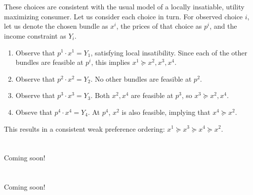 \documentclass[12pt]{article}
\theoremstyle{definition}
\theoremstyle{remark}
\begin{document}
\section{}
These choices are consistent with the usual model of a locally insatiable, utility maximizing consumer. Let us consider each choice in turn. For observed choice $i$, let us denote the chosen bundle as $x^i$, the prices of that choice as $p^i$, and the income constraint as $Y_i$.
\begin{enumerate}
  \item Observe that $p^1 \cdot x^1 = Y_1$, satisfying local insatibility. Since each of the other bundles are feasible at $p^i$, this implies $x^1 \succeq x^2, x^3, x^4$.
  \item Observe that $p^2 \cdot x^2 = Y_2$. No other bundles are feasible at $p^2$.
  \item Observe that $p^3 \cdot x^3 = Y_3$. Both $x^2, x^4$ are feasible at $p^3$, so $x^3 \succeq x^2, x^4$.
  \item Obseve that $p^4 \cdot x^4 = Y_4$. At $p^4$, $x^2$ is also feasible, implying that $x^4 \succeq x^2$.
\end{enumerate}
This results in a consistent weak preference ordering: $x^1 \succeq x^3 \succeq x^4 \succeq x^2$.
%
%
\section{}
Coming soon!
%
%
\section{}
Coming soon!
\end{document}
